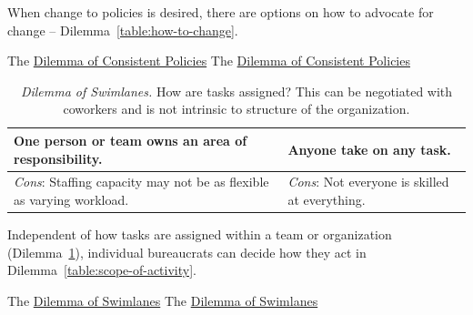 When change to policies is desired, there are options on how to advocate for change -- Dilemma~\ref{table:how-to-change}.

The \href{table:policy_consistency_across_cases}{Dilemma of Consistent Policies}
The \href{table:policy_consistency_across_cases}{Dilemma of Consistent Policies}


\begin{center}
\begin{table}[H] %
\begin{tabular}{ | m{\dilemmatablewidth}| m{\dilemmatablewidth} | } 
  \hline
  \textbf{One person or team owns an area of responsibility.} & 
  \textbf{Anyone take on any task.} \\ 
  \hline
  \textit{Cons}: Staffing capacity may not be as flexible as varying workload. & 
  \textit{Cons}: Not everyone is skilled at everything. \\  
  \hline
\end{tabular}
\caption{
\textit{Dilemma of Swimlanes.} 
How are tasks assigned? This can be negotiated with coworkers and is not intrinsic to structure of the organization. 
}
\label{table:swimlanes}
\end{table}
\end{center}


Independent of how tasks are assigned within a team or organization (Dilemma~\ref{table:swimlanes}), individual bureaucrats can decide how they act in Dilemma~\ref{table:scope-of-activity}.


The \href{table:swimlanes}{Dilemma of Swimlanes}
The \href{table:swimlanes}{Dilemma of Swimlanes}


